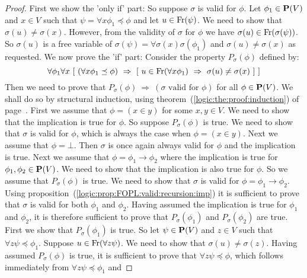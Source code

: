 \begin{proof}
    First we show the 'only if' part: So suppose $\sigma$ is valid for
    $\phi$. Let $\phi_{1}\in\mbox{${\bf P}(V)$}$ and $x\in V$ such that $\psi=\forall
    x\phi_{1}\preceq\phi$ and let $u\in\mbox{\rm Fr}(\psi)$. We need to show
    that $\sigma(u)\neq\sigma(x)$. However, from the validity of
    $\sigma$ for $\phi$ we have $\sigma(u)\in\mbox{\rm Fr}(\sigma(\psi))$. So
    $\sigma(u)$ is a free variable of $\sigma(\psi)=\forall\sigma(x)
    \sigma(\phi_{1})$ and $\sigma(u)\neq\sigma(x)$ as requested.
    We now prove the 'if' part: Consider the property $P_{\sigma}(\phi)$
    defined by:
    \[
        \forall\phi_{1}\forall x\ 
            [\ (\forall x\phi_{1}\preceq\phi)\ 
                \Rightarrow\ 
                [\
                    u\in\free(\forall x\phi_{1})\ 
                        \Rightarrow\
                    \sigma(u)\neq\sigma(x)
                \ ]
            \ ]
    \]
    Then we need to prove that $P_{\sigma}(\phi)\ \Rightarrow\
    (\mbox{$\sigma$ valid for $\phi$})$ for all $\phi\in\mbox{${\bf P}(V)$}$.
    We shall do so by structural induction, using
    theorem~(\ref{logic:the:proof:induction}) of
    page~\pageref{logic:the:proof:induction}. First we assume that
    $\phi=(x\in y)$ for some $x,y\in V$. We need to show that the
    implication is true for $\phi$. So suppose $P_{\sigma}(\phi)$ is
    true. We need to show that $\sigma$ is valid for $\phi$, which is
    always the case when $\phi=(x\in y)$. Next we assume that
    $\phi=\bot$. Then $\sigma$ is once again always valid for $\phi$ and
    the implication is true. Next we assume that
    $\phi=\phi_{1}\to\phi_{2}$ where the implication is true for
    $\phi_{1},\phi_{2}\in\mbox{${\bf P}(V)$}$. We need to show that the implication is
    also true for $\phi$. So we assume that $P_{\sigma}(\phi)$ is true.
    We need to show that $\sigma$ is valid for
    $\phi=\phi_{1}\to\phi_{2}$. Using
    proposition~(\ref{logic:prop:FOPL:valid:recursion:imp}) it is
    sufficient to prove that $\sigma$ is valid for both $\phi_{1}$ and
    $\phi_{2}$. Having assumed the implication is true for $\phi_{1}$
    and $\phi_{2}$, it is therefore sufficient to prove that
    $P_{\sigma}(\phi_{1})$ and $P_{\sigma}(\phi_{2})$ are true. First we
    show that $P_{\sigma}(\phi_{1})$ is true. So let $\psi\in\mbox{${\bf P}(V)$}$ and
    $z\in V$ such that $\forall z\psi\preceq\phi_{1}$. Suppose
    $u\in\mbox{\rm Fr}(\forall z\psi)$. We need to show that
    $\sigma(u)\neq\sigma(z)$. Having assumed $P_{\sigma}(\phi)$ is true,
    it is sufficient to prove that $\forall z\psi\preceq\phi$, which
    follows immediately from $\forall z\psi\preceq\phi_{1}$ and

\end{proof}
